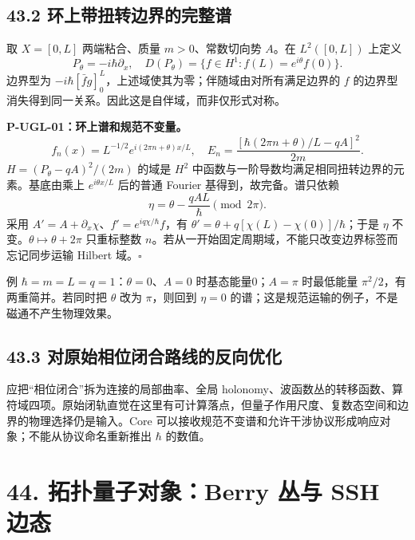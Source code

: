 \documentclass[
  11pt,
  oneside]{book}
\begin{document}
\hypertarget{ux73afux4e0aux5e26ux626dux8f6cux8fb9ux754cux7684ux5b8cux6574ux8c31}{%
\section{43.2
环上带扭转边界的完整谱}\label{ux73afux4e0aux5e26ux626dux8f6cux8fb9ux754cux7684ux5b8cux6574ux8c31}}

取 \(X=[0,L]\) 两端粘合、质量 \(m>0\)、常数切向势 \(A\)。在
\(L^2([0,L])\) 上定义 \[
P_\theta=-i\hbar\partial_x,
\quad D(P_\theta)=\{f\in H^1:f(L)=e^{i\theta}f(0)\}.
\] 边界型为
\(-i\hbar[\bar f g]_0^L\)，上述域使其为零；伴随域由对所有满足边界的
\(f\) 的边界型消失得到同一关系。因此这是自伴域，而非仅形式对称。

\protect\hypertarget{p-ugl-01}{}{}

\textbf{P-UGL-01：环上谱和规范不变量。} \[
f_n(x)=L^{-1/2}e^{i(2\pi n+\theta)x/L},\quad
E_n=\frac{[\hbar(2\pi n+\theta)/L-qA]^2}{2m}.
\] \(H=(P_\theta-qA)^2/(2m)\) 的域是 \(H^2\)
中函数与一阶导数均满足相同扭转边界的元素。基底由乘上 \(e^{i\theta x/L}\)
后的普通 Fourier 基得到，故完备。谱只依赖 \[
\eta=\theta-\frac{qAL}{\hbar}\pmod {2\pi}.
\] 采用 \(A'=A+\partial_x\chi\)、\(f'=e^{iq\chi/\hbar}f\)，有
\(\theta'=\theta+q[\chi(L)-\chi(0)]/\hbar\)；于是 \(\eta\)
不变。\(\theta\mapsto\theta+2\pi\) 只重标整数
\(n\)。若从一开始固定周期域，不能只改变边界标签而忘记同步运输 Hilbert
域。\(\square\)

例 \(\hbar=m=L=q=1\)：\(\theta=0\)、\(A=0\) 时基态能量0；\(A=\pi\)
时最低能量 \(\pi^2/2\)，有两重简并。若同时把 \(\theta\) 改为
\(\pi\)，则回到 \(\eta=0\)
的谱；这是规范运输的例子，不是磁通不产生物理效果。

\hypertarget{ux5bf9ux539fux59cbux76f8ux4f4dux95edux5408ux8defux7ebfux7684ux53cdux5411ux4f18ux5316}{%
\section{43.3
对原始相位闭合路线的反向优化}\label{ux5bf9ux539fux59cbux76f8ux4f4dux95edux5408ux8defux7ebfux7684ux53cdux5411ux4f18ux5316}}

应把``相位闭合''拆为连接的局部曲率、全局
holonomy、波函数丛的转移函数、算符域四项。原始闭轨直觉在这里有可计算落点，但量子作用尺度、复数态空间和边界的物理选择仍是输入。Core
可以接收规范不变谱和允许干涉协议形成响应对象；不能从协议命名重新推出
\(\hbar\) 的数值。

\hypertarget{ch-44}{%
\chapter{44. 拓扑量子对象：Berry 丛与 SSH 边态}\label{ch-44}}
\end{document}

